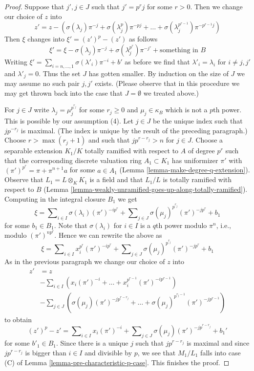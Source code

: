 \begin{proof}
\medskip\noindent
Suppose that $j', j \in J$ such that $j' = p^r j$ for some
$r > 0$. Then we change our choice of $z$ into
$$
z' = z -
(\sigma(\lambda_j) \pi^{-j} + \sigma(\lambda_j^p) \pi^{-pj} + \ldots +
\sigma(\lambda_j^{p^{r - 1}}) \pi^{-p^{r - 1}j})
$$
Then $\xi$ changes into $\xi' = (z')^p - (z')$ as follows
$$
\xi' =
\xi - \sigma(\lambda_j) \pi^{-j} + \sigma(\lambda_j^{p^r}) \pi^{-j'}
+ \text{something in }B
$$
Writing
$\xi' = \sum\nolimits_{i = n, \ldots, 1} \sigma(\lambda'_i) \pi^{-i} + b'$
as before we find that
$\lambda'_i = \lambda_i$ for $i \not = j, j'$ and $\lambda'_j = 0$.
Thus the set $J$ has gotten smaller.
By induction on the size of $J$ we may assume no such pair $j, j'$ exists.
(Please observe that in this procedure we may get thrown back into the case
that $J = \emptyset$ we treated above.)

\medskip\noindent
For $j \in J$ write $\lambda_j = \mu_j^{p^{r_j}}$ for some $r_j \geq 0$ and
$\mu_j \in \kappa_B$ which is not a $p$th power. This is possible by our
assumption (4). Let $j \in J$ be the unique index such that $j p^{-r_j}$
is maximal. (The index is unique by the result of the preceding paragraph.)
Choose $r > \max(r_j + 1)$ and such that $j p^{r - r_j} > n$ for $j \in J$.
Choose a separable extension $K_1/K$ totally ramified with respect to $A$
of degree $p^r$ such that the corresponding discrete valuation ring
$A_1 \subset K_1$ has uniformizer $\pi'$ with
$(\pi')^{p^r} = \pi + \pi^{n + 1}a$ for some $a \in A_1$
(Lemma \ref{lemma-make-degree-q-extension}).
Observe that $L_1 = L \otimes_K K_1$ is a field and that
$L_1/L$ is totally ramified with respect to $B$
(Lemma \ref{lemma-weakly-unramified-goes-up-along-totally-ramified}).
Computing in the integral closure $B_1$ we get
$$
\xi = \sum\nolimits_{i \in I} \sigma(\lambda_i) (\pi')^{-i p^r} +
\sum\nolimits_{j \in J} \sigma(\mu_j)^{p^{r_j}} (\pi')^{-j p^r} + b_1
$$
for some $b_1 \in B_1$. Note that $\sigma(\lambda_i)$ for $i \in I$
is a $q$th power modulo $\pi^n$, i.e., modulo $(\pi')^{n p^r}$.
Hence we can rewrite the above as
$$
\xi = \sum\nolimits_{i \in I} x_i^{p^r} (\pi')^{-i p^r} +
\sum\nolimits_{j \in J} \sigma(\mu_j)^{p^{r_j}} (\pi')^{- j p^r}
+ b_1
$$
As in the previous paragraph we change our choice of $z$ into
\begin{align*}
z' & = z \\
& -
\sum\nolimits_{i \in I}
\left(x_i (\pi')^{-i} + \ldots + x_i^{p^{r - 1}} (\pi')^{-i p^{r - 1}}\right)
\\
& -
\sum\nolimits_{j \in J}
\left(
\sigma(\mu_j) (\pi')^{- j p^{r - r_j}}
+ \ldots +
\sigma(\mu_j)^{p^{r_j - 1}} (\pi')^{- j p^{r - 1}}
\right)
\end{align*}
to obtain
$$
(z')^p - z' =
\sum\nolimits_{i \in I} x_i (\pi')^{-i} +
\sum\nolimits_{j \in J} \sigma(\mu_j) (\pi')^{- j p^{r - r_j}} + b_1'
$$
for some $b'_1 \in B_1$.
Since there is a unique $j$ such that $j p^{r - r_j}$ is maximal
and since $j p^{r - r_j}$ is bigger than $i \in I$ and divisible
by $p$, we see that $M_1 / L_1$ falls into case (C) of
Lemma \ref{lemma-pre-characteristic-p-case}.
This finishes the proof.
\end{proof}

